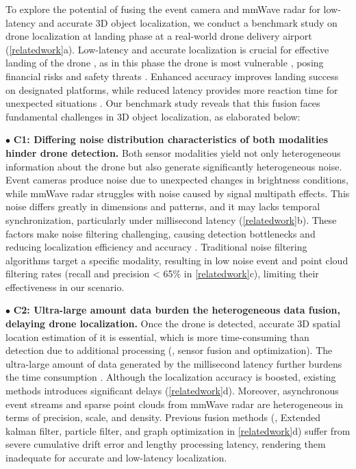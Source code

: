 To explore the potential of fusing the event camera and mmWave radar for low-latency and accurate 3D object localization, we conduct a benchmark study on drone localization at landing phase at a real-world drone delivery airport (\fig \ref{relatedwork}a). 
Low-latency and accurate localization is crucial for effective landing of the drone \cite{wang2022micnest, sun2023indoor}, as in this phase the drone is most vulnerable \cite{xu2023taming, floreano2015science}, posing financial risks and safety threats \cite{Russiandrone}. 
Enhanced accuracy improves landing success on designated platforms, while reduced latency provides more reaction time for unexpected situations \cite{famili2022pilot, he2023acoustic, chi2022wi}.
Our benchmark study reveals that this fusion faces fundamental challenges in 3D object localization, as elaborated below:
 
\noindent $\bullet$ \textbf{C1: Differing noise distribution characteristics of both modalities hinder drone detection.}
Both sensor modalities yield not only heterogeneous information about the drone but also generate significantly heterogeneous noise. 
Event cameras produce noise due to unexpected changes in brightness conditions, while mmWave radar struggles with noise caused by signal multipath effects.
This noise differs greatly in dimensions and patterns, and it may lacks temporal synchronization, particularly under millisecond latency (\fig \ref{relatedwork}b). 
These factors make noise filtering challenging, causing detection bottlenecks and reducing localization efficiency and accuracy \cite{xu2023taming}.
Traditional noise filtering algorithms \cite{cao2024virteach, liu2024pmtrack, wang2021asynchronous, alzugaray2018asynchronous} target a specific modality, resulting in low noise event and point cloud filtering rates (recall and precision < 65\% in \fig \ref{relatedwork}c), limiting their effectiveness in our scenario.


\noindent $\bullet$ \textbf{C2: Ultra-large amount data burden the heterogeneous data fusion, delaying drone localization.}
Once the drone is detected, accurate 3D spatial location estimation of it is essential, which is more time-consuming than detection due to additional processing (\eg, sensor fusion and optimization).
The ultra-large amount of data generated by the millisecond latency further burdens the time consumption \cite{xu2021followupar}. 
Although the localization accuracy is boosted, existing methods \cite{zhao20213d, falanga2020dynamic, mitrokhin2018event} introduces significant delays (\fig \ref{relatedwork}d).
Moreover, asynchronous event streams and sparse point clouds from mmWave radar are heterogeneous in terms of precision, scale, and density. 
Previous fusion methods (\eg, Extended kalman filter, particle filter, and graph optimization \cite{grisetti2010tutorial} in \fig \ref{relatedwork}d) suffer from severe cumulative drift error and lengthy processing latency, rendering them inadequate for accurate and low-latency localization.

